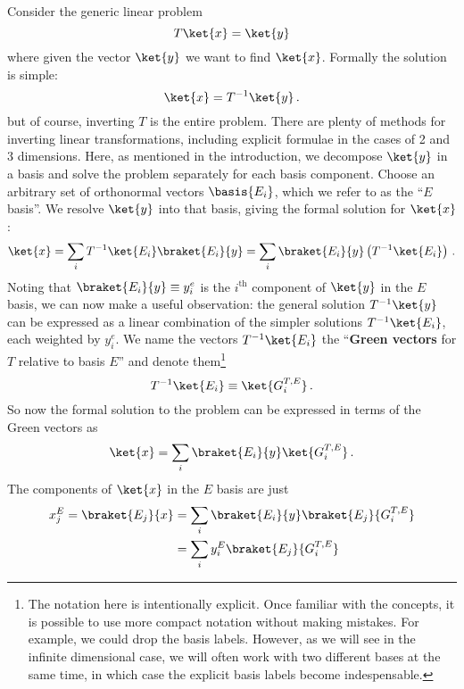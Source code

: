 
Consider the generic linear problem
\begin{equation}
  T \ket{x} = \ket{y}
\end{equation}
where given the vector $\ket{y}$ we want to find $\ket{x}$.
Formally the solution is simple:
\begin{equation}
  \ket{x} = T^{-1} \ket{y}
  \, .
\end{equation}
but of course, inverting $T$ is the entire problem.
There are plenty of methods for inverting linear transformations, including explicit formulae in the cases of 2 and 3 dimensions.
Here, as mentioned in the introduction, we decompose $\ket{y}$ in a basis and solve the problem separately for each basis component.
Choose an arbitrary set of orthonormal vectors $\basis{E_i}$, which we refer to as the ``$E$ basis''.
We resolve $\ket{y}$ into that basis, giving the formal solution for $\ket{x}$:
\begin{equation}
  \ket{x} = \sum_i T^{-1} \ket{E_i} \braket{E_i}{y}
  = \sum_i \braket{E_i}{y} \left( T^{-1} \ket{E_i} \right)
  \, .
\end{equation}
Noting that $\braket{E_i}{y} \equiv y_i^e$ is the $i^\text{th}$ component of $\ket{y}$ in the $E$ basis, we can now make a useful observation: the general solution $T^{-1}\ket{y}$ can be expressed as a linear combination of the simpler solutions $T^{-1}\ket{E_i}$, each weighted by $y_i^e$.
We name the vectors $T^{-1}\ket{E_i}$ the ``\textbf{Green vectors} for $T$ relative to basis $E$'' and denote them\footnote{The notation here is intentionally explicit.
Once familiar with the concepts, it is possible to use more compact notation without making mistakes. For example, we could drop the basis labels. However, as we will see in the infinite dimensional case, we will often work with two different bases at the same time, in which case the explicit basis labels become indespensable.}
\begin{equation}
  T^{-1} \ket{E_i} \equiv \ket{G^{T,E}_i}
  \, .
\end{equation}
So now the formal solution to the problem can be expressed in terms of the Green vectors as
\begin{equation}
  \ket{x} = \sum_i \braket{E_i}{y} \ket{G_i^{T,E}}
  \label{eq:green_vector_expansion}  %
  \, .
\end{equation}
The components of $\ket{x}$ in the $E$ basis are just
\begin{align}
  x_j^E = \braket{E_j}{x}
  & = \sum_i \braket{E_i}{y} \braket{E_j}{G_i^{T, E}} \nonumber \\
  & = \sum_i y_i^E \braket{E_j}{G_i^{T, E}}
\end{align}
